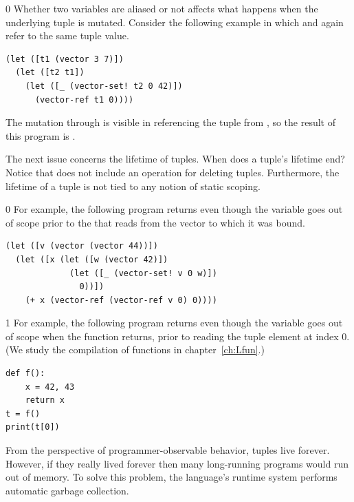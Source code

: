 \documentclass[7x10]{TimesAPriori_MIT}%
\def\racketEd{0}
\def\pythonEd{1}
\def\edition{1}
\newcommand{\pythonColor}[0]{}
\numberwithin{theorem}{chapter}
\numberwithin{definition}{chapter}
\numberwithin{equation}{chapter}
\begin{document}
{\if\edition\racketEd        
Whether two variables are aliased or not affects what happens
when the underlying tuple is mutated.
Consider the following example in which  and 
again refer to the same tuple value.
\begin{center}
\begin{minipage}{0.96\textwidth}
\begin{lstlisting}
(let ([t1 (vector 3 7)])
  (let ([t2 t1])
    (let ([_ (vector-set! t2 0 42)])
      (vector-ref t1 0))))
\end{lstlisting}
\end{minipage}
\end{center}
The mutation through  is visible in referencing the tuple
from , so the result of this program is .
\fi}

The next issue concerns the lifetime of tuples. When does a tuple's
lifetime end?  Notice that \LangVec{} does not include an operation
for deleting tuples. Furthermore, the lifetime of a tuple is not tied
to any notion of static scoping.
%
{\if\edition\racketEd        
%
For example, the following program returns  even though the
variable  goes out of scope prior to the 
that reads from the vector to which it was bound.
\begin{center}
\begin{minipage}{0.96\textwidth}
\begin{lstlisting}
(let ([v (vector (vector 44))])
  (let ([x (let ([w (vector 42)])
             (let ([_ (vector-set! v 0 w)])
               0))])
    (+ x (vector-ref (vector-ref v 0) 0))))
\end{lstlisting}
\end{minipage}
\end{center}
\fi}
%
{\if\edition\pythonEd\pythonColor
%
For example, the following program returns  even though the
variable  goes out of scope when the function returns, prior
to reading the tuple element at index $0$. (We study the compilation
of functions in chapter~\ref{ch:Lfun}.)
%  
\begin{center}
\begin{minipage}{0.96\textwidth}
\begin{lstlisting}
def f():
    x = 42, 43
    return x
t = f()
print(t[0])
\end{lstlisting}
\end{minipage}
\end{center}
\fi}
%
From the perspective of programmer-observable behavior, tuples live
forever. However, if they really lived forever then many long-running
programs would run out of memory. To solve this problem, the
language's runtime system performs automatic garbage collection.
\end{document}
